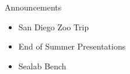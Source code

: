 \begin{frame}{Announcements}
    \begin{itemize}
        \item San Diego Zoo Trip
        \item End of Summer Presentations
        \item Sealab Bench
    \end{itemize}
\end{frame}

